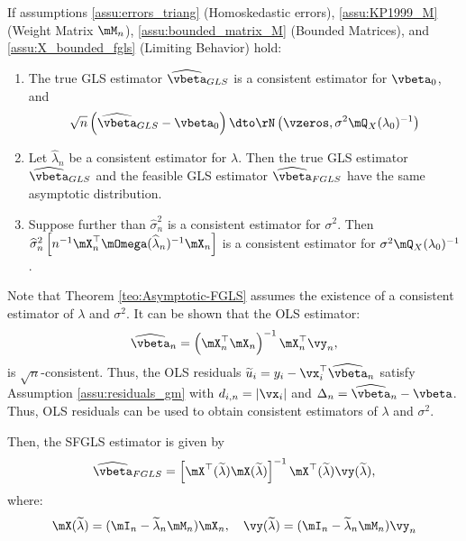 \documentclass[english,12pt]{book}\usepackage[]{graphicx}\usepackage[]{xcolor}
\begin{document}
\begin{theorem}\label{teo:Asymptotic-FGLS}
  If assumptions \ref{assu:errors_triang} (Homoskedastic errors), \ref{assu:KP1999_M} (Weight Matrix $\mM_n$), \ref{assu:bounded_matrix_M} (Bounded Matrices), and \ref{assu:X_bounded_fgls} (Limiting Behavior) hold: 
  \begin{enumerate}
    \item The true GLS estimator $\widehat{\vbeta}_{GLS}$ is a consistent estimator for $\vbeta_0$, and
    \begin{equation*}
      \sqrt{n}\left(\widehat{\vbeta}_{GLS} - \vbeta_0\right)\dto \rN\left(\vzeros, \sigma^2 \mQ_X(\lambda_0)^{-1}\right)
    \end{equation*}
    
    \item Let $\widehat{\lambda}_n$ be a consistent estimator for $\lambda$. Then the true GLS estimator $\widehat{\vbeta}_{GLS}$ and the feasible GLS estimator $\widehat{\vbeta}_{FGLS}$ have the same asymptotic distribution.
    \item Suppose further than $\widehat{\sigma}^2_n$ is a consistent estimator for $\sigma^2$. Then $\widehat{\sigma}^2_n\left[n^{-1}\mX^\top_n\mOmega(\widehat{\lambda}_n)^{-1}\mX_n\right]$ is a consistent estimator for $\sigma^2 \mQ_X(\lambda_0)^{-1}$.
  \end{enumerate}
\end{theorem}

Note that Theorem \ref{teo:Asymptotic-FGLS} assumes the existence of a consistent estimator of $\lambda$ and $\sigma^2$. It can be shown that the OLS estimator:
\begin{equation*}
\widehat{\vbeta}_n = \left(\mX^\top_n\mX_n\right)^{-1}\mX^\top_n\vy_n, 
\end{equation*}
%
is $\sqrt{n}$-consistent. Thus, the OLS residuals $\widetilde{u}_i = y_i - \vx_i^\top\widehat{\vbeta}_n$ satisfy Assumption \ref{assu:residuals_gm} with $d_{i, n} = \left|\vx_i\right|$ and $\Delta_n = \widehat{\vbeta}_n -\vbeta$. Thus, OLS residuals can be used to obtain consistent estimators of $\lambda$ and $\sigma^2$.

Then, the SFGLS estimator is given by
\begin{equation*}
  \widehat{\vbeta}_{FGLS} = \left[\mX^\top(\widetilde{\lambda})\mX(\widetilde{\lambda})\right]^{-1}\mX^\top(\widetilde{\lambda})\vy(\widetilde{\lambda}),
\end{equation*}
%
where:
\begin{equation*}
  \mX(\widetilde{\lambda})  = (\mI_n-\widetilde{\lambda}_n\mM_n)\mX_n, \quad \vy(\widetilde{\lambda})  = (\mI_n-\widetilde{\lambda}_n\mM_n)\vy_n
\end{equation*}
\end{document}
